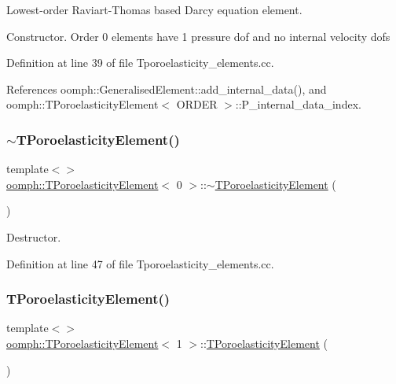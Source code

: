 Lowest-\/order Raviart-\/\+Thomas based Darcy equation element. 

Constructor. Order 0 elements have 1 pressure dof and no internal velocity dofs 

Definition at line 39 of file Tporoelasticity\+\_\+elements.\+cc.



References oomph\+::\+Generalised\+Element\+::add\+\_\+internal\+\_\+data(), and oomph\+::\+T\+Poroelasticity\+Element$<$ O\+R\+D\+E\+R $>$\+::\+P\+\_\+internal\+\_\+data\+\_\+index.

\mbox{\label{classoomph_1_1TPoroelasticityElement_a71f8aa5d7346c2ac246e381e022737a0}} 
\subsubsection{\texorpdfstring{$\sim$\+T\+Poroelasticity\+Element()}{~TPoroelasticityElement()}\hspace{0.1cm}{\footnotesize\ttfamily [2/3]}}
{\footnotesize\ttfamily template$<$$>$ \\
\hyperlink{classoomph_1_1TPoroelasticityElement}{oomph\+::\+T\+Poroelasticity\+Element}$<$ 0 $>$\+::$\sim$\hyperlink{classoomph_1_1TPoroelasticityElement}{T\+Poroelasticity\+Element} (\begin{DoxyParamCaption}{ }\end{DoxyParamCaption})}



Destructor. 



Definition at line 47 of file Tporoelasticity\+\_\+elements.\+cc.

\mbox{\label{classoomph_1_1TPoroelasticityElement_abbcb62286bbece7beb0ed513db5bfd65}} 
\subsubsection{\texorpdfstring{T\+Poroelasticity\+Element()}{TPoroelasticityElement()}\hspace{0.1cm}{\footnotesize\ttfamily [3/3]}}
{\footnotesize\ttfamily template$<$$>$ \\
\hyperlink{classoomph_1_1TPoroelasticityElement}{oomph\+::\+T\+Poroelasticity\+Element}$<$ 1 $>$\+::\hyperlink{classoomph_1_1TPoroelasticityElement}{T\+Poroelasticity\+Element} (\begin{DoxyParamCaption}{ }\end{DoxyParamCaption})}



